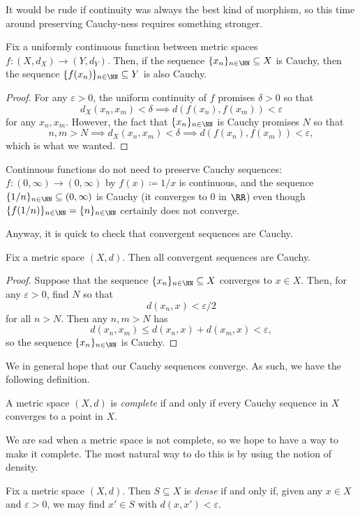 \documentclass[../notes.tex]{subfiles}
\begin{document}
It would be rude if continuity was always the best kind of morphism, so this time around preserving Cauchy-ness requires something stronger.
\begin{lemma} \label{lem:uniformcontpreservecauchy}
	Fix a uniformly continuous function between metric spaces $f\colon(X,d_X)\to(Y,d_Y)$. Then, if the sequence $\{x_n\}_{n\in\NN}\subseteq X$ is Cauchy, then the sequence $\{f(x_n)\}_{n\in\NN}\subseteq Y$ is also Cauchy.
\end{lemma}
\begin{proof}
	For any $\varepsilon>0$, the uniform continuity of $f$ promises $\delta>0$ so that
	\[d_X(x_n,x_m)<\delta\implies d(f(x_n),f(x_m))<\varepsilon\]
	for any $x_n,x_m$. However, the fact that $\{x_n\}_{n\in\NN}$ is Cauchy promises $N$ so that
	\[n,m>N\implies d_X(x_n,x_m)<\delta\implies d(f(x_n),f(x_m))<\varepsilon,\]
	which is what we wanted.
\end{proof}
\begin{example}
	Continuous functions do not need to preserve Cauchy sequences: $f\colon(0,\infty)\to(0,\infty)$ by $f(x)\coloneqq 1/x$ is continuous, and the sequence $\{1/n\}_{n\in\NN}\subseteq(0,\infty)$ is Cauchy (it converges to $0$ in $\RR$) even though $\{f(1/n)\}_{n\in\NN}=\{n\}_{n\in\NN}$ certainly does not converge.
\end{example}
Anyway, it is quick to check that convergent sequences are Cauchy.
\begin{lemma}
	Fix a metric space $(X,d)$. Then all convergent sequences are Cauchy.
\end{lemma}
\begin{proof}
	Suppose that the sequence $\{x_n\}_{n\in\NN}\subseteq X$ converges to $x\in X$. Then, for any $\varepsilon>0$, find $N$ so that
	\[d(x_n,x)<\varepsilon/2\]
	for all $n>N$. Then any $n,m>N$ has
	\[d(x_n,x_m)\le d(x_n,x)+d(x_m,x)<\varepsilon,\]
	so the sequence $\{x_n\}_{n\in\NN}$ is Cauchy.
\end{proof}
We in general hope that our Cauchy sequences converge. As such, we have the following definition.
\begin{definition}[Complete]
	A metric space $(X,d)$ is \textit{complete} if and only if every Cauchy sequence in $X$ converges to a point in $X$.
\end{definition}
We are sad when a metric space is not complete, so we hope to have a way to make it complete. The most natural way to do this is by using the notion of density.
\begin{definition}[Density]
	Fix a metric space $(X,d)$. Then $S\subseteq X$ is \textit{dense} if and only if, given any $x\in X$ and $\varepsilon>0$, we may find $x'\in S$ with $d(x,x')<\varepsilon$.
\end{definition}
\end{document}
